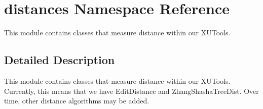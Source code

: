 \hypertarget{namespacedistances}{\section{distances Namespace Reference}
\label{namespacedistances}
}


This module contains classes that measure distance within our X\-U\-Tools.  




\subsection{Detailed Description}
This module contains classes that measure distance within our X\-U\-Tools. Currently, this means that we have Edit\-Distance and Zhang\-Shasha\-Tree\-Dist. Over time, other distance algorithms may be added. 